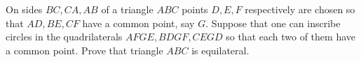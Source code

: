 On sides $BC,CA,AB$ of a triangle $ABC$ points $D,E,F$ respectively are chosen so that $AD,BE,CF$ have a common point, say $G$. Suppose that one can inscribe circles in the quadrilaterals $AFGE,BDGF,CEGD$ so that each two of them have a common point. Prove that triangle $ABC$ is equilateral.
